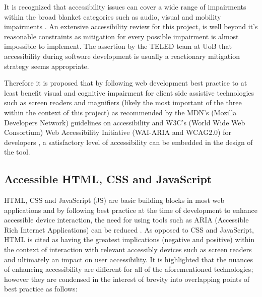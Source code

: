 It is recognized that accessibility issues can cover a wide range of impairments within the broad blanket categories such as audio, visual and mobility impairments \cite{Mills2015}. An extensive accessibility review for this project, is well beyond it's reasonable constraints as mitigation for every possible impairment is almost impossible to implement. The assertion by the TELED team at UoB that accessibility during software development is usually a reactionary mitigation strategy seems appropriate.

Therefore it is proposed that by following web development best practice to at least benefit visual and cognitive impairment for  client side assistive technologies such as screen readers and magnifiers (likely the most important of the three within the context of this project) as recommended by the MDN's (Mozilla Developers Network) guidelines \cite{Mills2015,Mills2016} on accessibility and W3C's (World Wide Web Consortium) Web Accessibility Initiative (WAI-ARIA and WCAG2.0) for developers \cite{W3C}, a satisfactory level of accessibility can be embedded in the design of the tool.

\subsection{Accessible HTML, CSS and JavaScript}

HTML, CSS and JavaScript (JS) are basic building blocks in most web applications and by following  best practice at the time of development to enhance accessible device interaction, the need for using tools such as ARIA (Accessible Rich Internet Applications) can be reduced \cite{W3C,OWASP,Mills2015,Mills2016}. As opposed to CSS and JavaScript, HTML is cited as having the greatest implications (negative and positive)  within the context of interaction with relevant accessibly devices such as screen readers \cite{Mills,Mills2017} and ultimately an impact on user accessibility.  It is highlighted that the nuances of enhancing accessibility are different for all of the aforementioned technologies; however they are condensed in the interest of brevity into overlapping points of best practice as follows:


